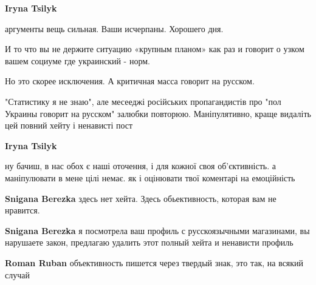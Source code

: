 \begin{itemize}
\begin{itemize}
\textbf{Iryna Tsilyk} 

аргументы вещь сильная. Ваши исчерпаны. Хорошего дня.

И то что вы не держите ситуацию «крупным планом» как раз и говорит о узком
вашем социуме где украинский - норм.

Но это скорее исключения. А критичная масса говорит на русском.


 
"Статистику я не знаю", але месееджі російських пропагандистів про "пол
Украины говорит на русском" залюбки повторюю. Маніпулятивно, краще видаліть цей
повний хейту і ненависті пост

 
\textbf{Iryna Tsilyk} 

ну бачиш, в нас обох є наші оточення, і для кожної своя об’єктивність. а
маніпулювати в мене цілі немає. як і оцінювати твої коментарі на емоційність

 
\textbf{Snigana Berezka} здесь нет хейта. Здесь обьективность, которая вам не нравится.

 
\textbf{Snigana Berezka} я посмотрела ваш профиль с русскоязычными магазинами, вы нарушаете закон, предлагаю удалить этот полный хейта и ненависти профиль

 
\textbf{Roman Ruban} объективность пишется через твердый знак, это так, на всякий случай


\end{itemize}
\end{itemize}
